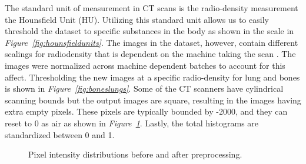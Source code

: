 \documentclass[conference,11pt]{IEEEtran}
\begin{document}
The standard unit of measurement in CT scans is the radio-density measurement the Hounsfield Unit (HU). Utilizing this standard unit allows us to easily threshold the dataset to specific substances in the body as shown in the scale in \textit{Figure~\ref{fig:hounsfieldunits}}. The images in the dataset, however, contain different scalings for radiodensity that is dependent on the machine taking the scan \cite{noauthor_data_nodate}. The images were normalized across machine dependent batches to account for this affect. Thresholding the new images at a specific radio-density for lung and bones is shown in \textit{Figure~\ref{fig:boneslungs}}. Some of the CT scanners have cylindrical scanning bounds but the output images are square, resulting in the images having extra empty pixels. These pixels are typically bounded by -2000, and they can reset to 0 as air as shown in \textit{Figure~\ref{fig:hist}}. Lastly, the total histograms are standardized between 0 and 1.
\begin{figure}[htb]
    \centering
    	\hspace{0.02\linewidth}
      \caption{Pixel intensity distributions before and after preprocessing.}
      \label{fig:hist}
\end{figure}
\end{document}
